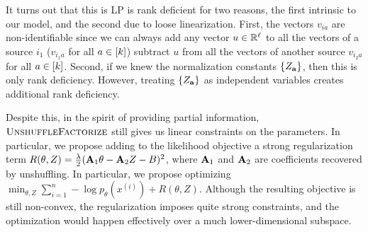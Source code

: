 \begin{enumerate}
  It turns out that this is LP is rank deficient for two reasons, the first intrinsic to our model,
  and the second due to loose linearization.
  First, the vectors $v_{ia}$ are non-identifiable since we can always add any vector $u \in \mathbb{R}^\ell$ to
  all the vectors of a source $i_1$ ($v_{i_1 a}$ for all $a \in [k]$)
  subtract $u$ from all the vectors of another source $v_{i_2 a}$ for all $a \in [k]$.
  Second, if we knew the normalization constants $\{Z_{\mathbf{a}}\}$, then this is only rank deficiency.
  However, treating $\{Z_{\mathbf{a}}\}$ as independent variables creates additional rank deficiency.

  Despite this, in the spirit of providing partial information,
  $\text{\sc UnshuffleFactorize}$ still gives us linear constraints on the parameters.
  In particular, we propose adding to the likelihood objective a strong regularization term
  $R(\theta, Z) = \frac{\lambda}{2} (\mathbf{A}_1 \theta - \mathbf{A}_2 Z - B)^2$, where $\mathbf{A}_1$ and $\mathbf{A}_2$ are coefficients
  recovered by unshuffling.
  In particular, we propose optimizing $\min_{\theta, Z} \sum_{i=1}^n -\log p_\theta(x^{(i)}) + R(\theta, Z)$.
  Although the resulting objective is still non-convex, the regularization imposes quite strong constraints,
  and the optimization would happen effectively over a much lower-dimensional subspace.
\end{enumerate}
